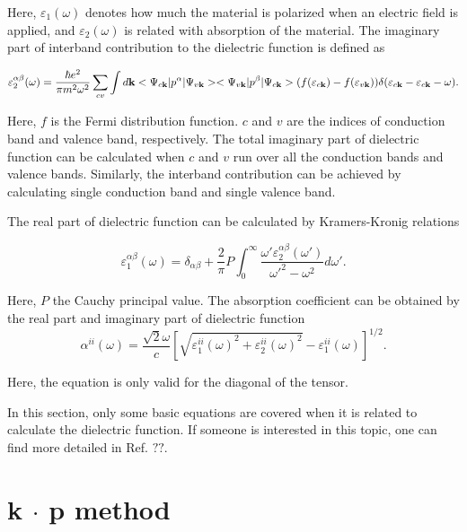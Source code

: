\documentclass[a4paper, 12pt, titlepage,oneside,drop]{kthesis}
\begin{document}
Here, $\varepsilon_1(\omega)$ denotes how much the material is polarized when an electric field is applied, and $\varepsilon_2(\omega)$ is related with absorption of the material. The imaginary part of interband contribution to the dielectric function is defined as

\begin{equation}\label{df2}
\varepsilon_2^{\alpha\beta} (\omega)= \frac{\hbar e^2}{\pi m^2\omega^2} \sum_{cv} \int d \textbf {k} <\Psi_{c{\textbf k}}|p^\alpha|\Psi_{v{\textbf k}}><\Psi_{v{\textbf k}}|p^\beta|\Psi_{c{\textbf k}}> (f(\varepsilon_{c \textbf k})-f(\varepsilon_{v \textbf k}))\delta(\varepsilon_{c {\textbf k}}-\varepsilon_{c{\textbf k}}-\omega).
\end{equation}

Here, $f$ is the Fermi distribution function. $c$ and $v$ are the indices of conduction band and valence band, respectively. The total imaginary part of dielectric function can be calculated when $c$ and $v$ run over all the conduction bands and valence bands. Similarly, the
interband contribution can be achieved by calculating single conduction band and single valence band.   

The real part of dielectric function can be calculated by Kramers-Kronig relations

\begin{equation}
 \varepsilon_1^{\alpha\beta} (\omega)= \delta_{\alpha\beta}+\frac{2}{\pi}P\int^{\infty}_{0} \frac{\omega'\varepsilon_2^{\alpha\beta}(\omega')}{\omega'^{2}-\omega^{2}} d\omega'.
\end{equation}

Here, $P$ the Cauchy principal value. The absorption coefficient can be obtained by the real part and imaginary part of dielectric function
\begin{equation}
 \alpha^{ii}(\omega) = \frac{\sqrt{2}\omega}{c} \left[ \sqrt{{\varepsilon^{ii}_1(\omega)}^2+{\varepsilon^{ii}_2(\omega)}^2}-{\varepsilon^{ii}_1(\omega)} \right]^{1/2}.
\end{equation}

Here, the equation is only valid for the diagonal of the tensor.

In this section, only some basic equations are covered when it is related to calculate the dielectric function. If someone is interested in this topic, one can find more detailed in Ref. $??$.


\section{k $\cdot$ p method}
\label{kpmaa}
\end{document}
